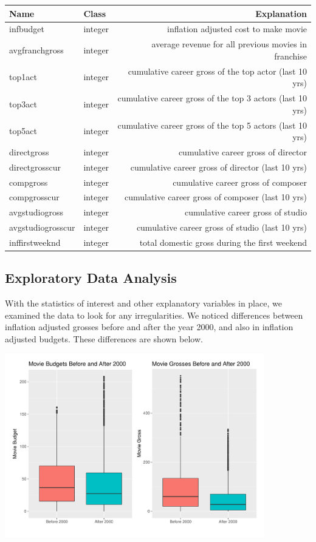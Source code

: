 \documentclass{svproc}
\begin{document}
\begin{table}[ht]
\centering
\begin{tabular}{llr}
  \hline
 Name & Class & Explanation \\ 
  \hline
infbudget & integer & inflation adjusted cost to make movie \\ 
   avgfranchgross & integer & average revenue for all previous movies in franchise \\ 
  top1act & integer & cumulative career gross of the top actor (last 10 yrs) \\ 
   top3act & integer & cumulative career gross of the top 3 actors (last 10 yrs) \\ 
  top5act & integer & cumulative career gross of the top 5 actors (last 10 yrs) \\ 
  directgross & integer & cumulative career gross of director \\ 
  directgrosscur & integer & cumulative career gross of director (last 10 yrs) \\ 
   compgross & integer & cumulative career gross of composer \\ 
   compgrosscur & integer & cumulative career gross of composer (last 10 yrs) \\ 
   avgstudiogross & integer & cumulative career gross of studio \\ 
   avgstudiogrosscur & integer & cumulative career gross of studio (last 10 yrs) \\ 
   inffirstweeknd & integer & total domestic gross during the first weekend \\
   \hline
\end{tabular}
\setlength{\tabcolsep}{3em}
\end{table}

\newpage
\subsection{Exploratory Data Analysis}
With the statistics of interest and other explanatory variables in place, we examined the data to look for any irregularities. We noticed differences between inflation adjusted grosses before and after the year 2000, and also in inflation adjusted budgets. These differences are shown below.

\begin{center}
\includegraphics [height=8cm]{dataissue.pdf}
\end{center}
\end{document}
